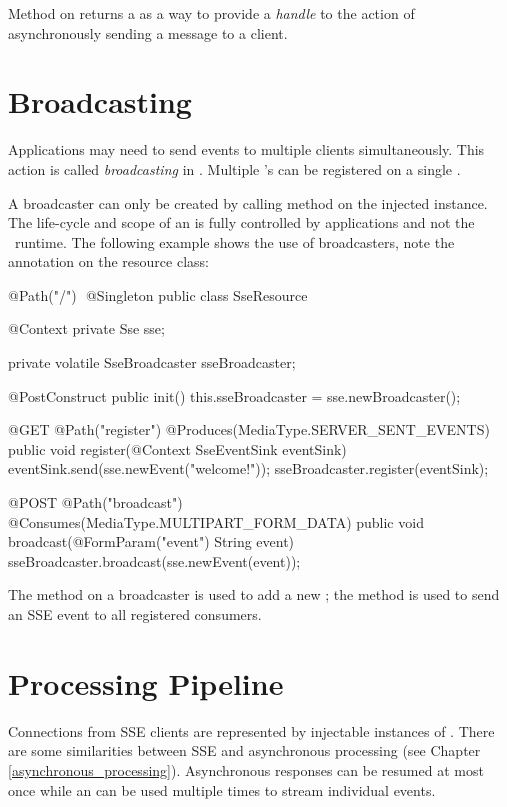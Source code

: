 Method  on  returns a  as a way to provide a \emph{handle} to the action of asynchronously sending a message to a client.

\section{Broadcasting}
\label{sse_broadcasting}

Applications may need to send events to multiple clients simultaneously. This action is called \emph{broadcasting} in \jaxrs. Multiple 's can be registered on a single . 

A broadcaster can only be created by calling method  on the injected  instance. The life-cycle and scope of an  is fully controlled by applications and not the \jaxrs\ runtime. The following example shows the use of broadcasters, note the  annotation on the resource class:

\begin{listing}{1}
@Path("/") 
@Singleton
public class SseResource {
	
  @Context
  private Sse sse;
  
  private volatile SseBroadcaster sseBroadcaster;
	
  @PostConstruct
  public init() {
    this.sseBroadcaster = sse.newBroadcaster();
  }  
	
  @GET
  @Path("register")
  @Produces(MediaType.SERVER_SENT_EVENTS)
  public void register(@Context SseEventSink eventSink) {
    eventSink.send(sse.newEvent("welcome!"));
    sseBroadcaster.register(eventSink);
  }  
	
  @POST
  @Path("broadcast")
  @Consumes(MediaType.MULTIPART_FORM_DATA)
  public void broadcast(@FormParam("event") String event) { 
    sseBroadcaster.broadcast(sse.newEvent(event));
  } 
}
\end{listing}

The  method on a broadcaster is used to add a new ; the
 method is used to send an SSE event to all registered consumers.

\section{Processing Pipeline}
\label{sse_pipeline}

Connections from SSE clients are represented by injectable instances of . There are some similarities between SSE and asynchronous processing (see Chapter \ref{asynchronous_processing}). Asynchronous responses can be resumed at most once while an  can be used multiple times to stream individual events. 

